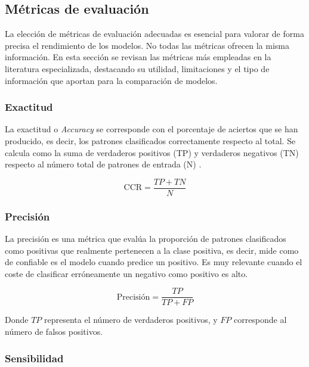 \subsection{Métricas de evaluación}
\label{subsec:2_metricas}

La elección de métricas de evaluación adecuadas es esencial para valorar de forma precisa el rendimiento de los modelos. No todas las métricas ofrecen la misma información. En esta sección se revisan las métricas más empleadas en la literatura especializada, destacando su utilidad, limitaciones y el tipo de información que aportan para la comparación de modelos.

\subsubsection{Exactitud}
\label{subsubsec:acc}

La exactitud o \textit{Accuracy} se corresponde con el porcentaje de aciertos que se han producido, es decir, los patrones clasificados correctamente respecto al total. Se calcula como la suma de verdaderos positivos (TP) y verdaderos negativos (TN) respecto al número total de patrones de entrada (N) \cite{metrics}.

\begin{equation}
	\label{eq:accuracy}
	\text{CCR} = \frac{TP+TN}{N}
\end{equation}

\subsubsection{Precisión}
\label{subsubsec:prec}

La precisión es una métrica que evalúa la proporción de patrones clasificados como positivas que realmente pertenecen a la clase positiva, es decir, mide como de confiable es el modelo cuando predice un positivo. Es muy relevante cuando el coste de clasificar erróneamente un negativo como positivo es alto.

\begin{equation}
	\text{Precisión} = \frac{TP}{TP + FP}
	\label{eq:precision}
\end{equation}

Donde \(TP\) representa el número de verdaderos positivos, y \(FP\) corresponde al número de falsos positivos.

\subsubsection{Sensibilidad}
\label{subsubsec:sens}

